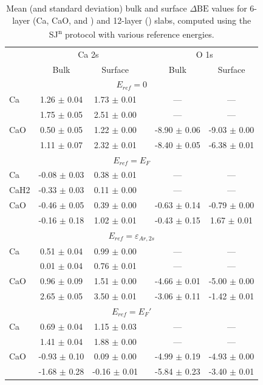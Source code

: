 \documentclass[journal=jpccck,manuscript=article]{achemso}
\def\dbe{\ensuremath{\Delta\text{BE}}}
\begin{document}
\begin{table}
	\begin{tabular}{l cc c cc}
		\toprule
		& \multicolumn{2}{c}{Ca 2s} &&  \multicolumn{2}{c}{O 1s}\\
		\cline{2-3} \cline{5-6}
		& Bulk & Surface & & Bulk & Surface \\
		\midrule
		\multicolumn{6}{c}{$E_{ref}=0$}  \\
		\midrule
		Ca & 1.26 $\pm$ 0.04 & 1.73 $\pm$ 0.01 &  & --- & --- \\
		\ce{CaH2} & 1.75 $\pm$ 0.05 & 2.51 $\pm$ 0.00 &  & --- & --- \\
		CaO & 0.50 $\pm$ 0.05 & 1.22 $\pm$ 0.00 &  & -8.90 $\pm$ 0.06 & -9.03 $\pm$ 0.00 \\
		\ce{CaO.H2O} & 1.11 $\pm$ 0.07 & 2.32 $\pm$ 0.01 &  & -8.40 $\pm$ 0.05 & -6.38 $\pm$ 0.01 \\
		\midrule
		\multicolumn{6}{c}{$E_{ref}=E_F$}  \\
		\midrule
		Ca & -0.08 $\pm$ 0.03 & 0.38 $\pm$ 0.01 &  & --- & --- \\
		CaH2 & -0.33 $\pm$ 0.03 & 0.11 $\pm$ 0.00 &  & --- & --- \\
		CaO & -0.46 $\pm$ 0.05 & 0.39 $\pm$ 0.00 &  & -0.63 $\pm$ 0.14 & -0.79 $\pm$ 0.00 \\
		\ce{CaO.H2O} & -0.16 $\pm$ 0.18 & 1.02 $\pm$ 0.01 &  & -0.43 $\pm$ 0.15 & 1.67 $\pm$ 0.01 \\
		\midrule
		\multicolumn{6}{c}{$E_{ref}=\varepsilon_{Ar,2s}$}  \\
		\midrule
		Ca & 0.51 $\pm$ 0.04 & 0.99 $\pm$ 0.00 &  & --- & --- \\
		\ce{CaH2} & 0.01 $\pm$ 0.04 & 0.76 $\pm$ 0.01 &  & --- & --- \\
		CaO & 0.96 $\pm$ 0.09 & 1.51 $\pm$ 0.00 &  & -4.66 $\pm$ 0.01 & -5.00 $\pm$ 0.00 \\
		\ce{CaO.H2O} & 2.65 $\pm$ 0.05 & 3.50 $\pm$ 0.01 &  & -3.06 $\pm$ 0.11 & -1.42 $\pm$ 0.01 \\
		\midrule
		\multicolumn{6}{c}{$E_{ref}=E_F'$ }  \\
		\midrule
		Ca & 0.69 $\pm$ 0.04 & 1.15 $\pm$ 0.03 &  & --- & --- \\
		\ce{CaH2} & 1.41 $\pm$ 0.04 & 1.88 $\pm$ 0.00 &  & --- & --- \\
		CaO & -0.93 $\pm$ 0.10 & 0.09 $\pm$ 0.00 &  & -4.99 $\pm$ 0.19 & -4.93 $\pm$ 0.00 \\
		\ce{CaO.H2O} & -1.68 $\pm$ 0.28 & -0.16 $\pm$ 0.01 &  & -5.84 $\pm$ 0.23 & -3.40 $\pm$ 0.01 \\
		\bottomrule
	\end{tabular}
	\caption{Mean (and standard deviation) bulk and surface \dbe{} values for 6-layer (Ca, CaO, and ) and 12-layer () slabs, computed using the SJ\textsuperscript{n} protocol with various reference energies.}
\end{table}
\end{document}
